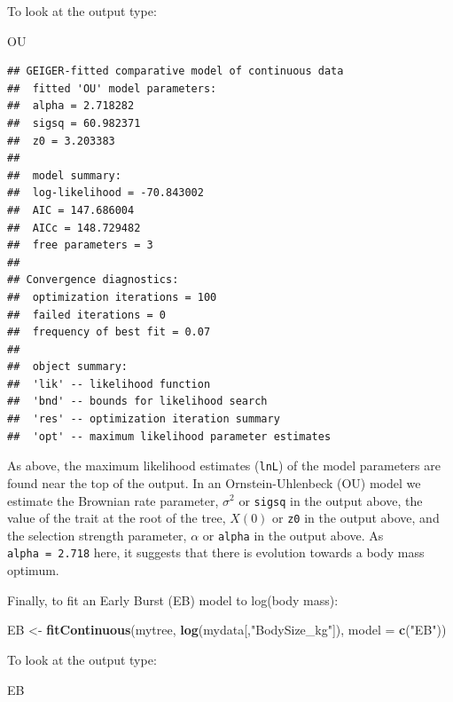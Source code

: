 \documentclass[]{book}
\newenvironment{Shaded}{\begin{snugshade}}{\end{snugshade}}
\newcommand{\KeywordTok}[1]{\textcolor[rgb]{0.13,0.29,0.53}{\textbf{{#1}}}}
\newcommand{\DataTypeTok}[1]{\textcolor[rgb]{0.13,0.29,0.53}{{#1}}}
\newcommand{\StringTok}[1]{\textcolor[rgb]{0.31,0.60,0.02}{{#1}}}
\newcommand{\NormalTok}[1]{{#1}}
\theoremstyle{definition}
\theoremstyle{definition}
\theoremstyle{definition}
\theoremstyle{remark}
\begin{document}
To look at the output type:

\begin{Shaded}
\begin{Highlighting}[]
\NormalTok{OU}
\end{Highlighting}
\end{Shaded}

\begin{verbatim}
## GEIGER-fitted comparative model of continuous data
##  fitted 'OU' model parameters:
##  alpha = 2.718282
##  sigsq = 60.982371
##  z0 = 3.203383
## 
##  model summary:
##  log-likelihood = -70.843002
##  AIC = 147.686004
##  AICc = 148.729482
##  free parameters = 3
## 
## Convergence diagnostics:
##  optimization iterations = 100
##  failed iterations = 0
##  frequency of best fit = 0.07
## 
##  object summary:
##  'lik' -- likelihood function
##  'bnd' -- bounds for likelihood search
##  'res' -- optimization iteration summary
##  'opt' -- maximum likelihood parameter estimates
\end{verbatim}

As above, the maximum likelihood estimates (\texttt{lnL}) of the model
parameters are found near the top of the output. In an
Ornstein-Uhlenbeck (OU) model we estimate the Brownian rate parameter,
\(\sigma^2\) or \texttt{sigsq} in the output above, the value of the
trait at the root of the tree, \(X(0)\) or \texttt{z0} in the output
above, and the selection strength parameter, \(\alpha\) or
\texttt{alpha} in the output above. As \texttt{alpha\ =\ 2.718} here, it
suggests that there is evolution towards a body mass optimum.

Finally, to fit an Early Burst (EB) model to log(body mass):

\begin{Shaded}
\begin{Highlighting}[]
\NormalTok{EB <-}\StringTok{ }\KeywordTok{fitContinuous}\NormalTok{(mytree, }\KeywordTok{log}\NormalTok{(mydata[,}\StringTok{"BodySize_kg"}\NormalTok{]), }\DataTypeTok{model =} \KeywordTok{c}\NormalTok{(}\StringTok{"EB"}\NormalTok{))}
\end{Highlighting}
\end{Shaded}

To look at the output type:

\begin{Shaded}
\begin{Highlighting}[]
\NormalTok{EB}
\end{Highlighting}
\end{Shaded}
\end{document}
